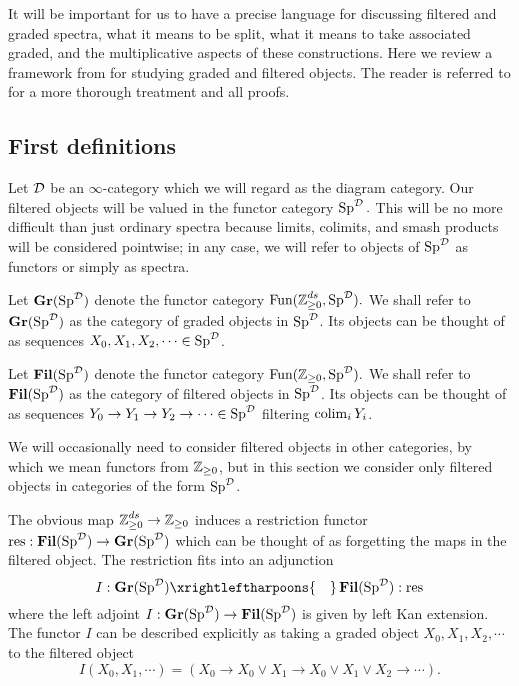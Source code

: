 
It will be important for us to have a precise language for discussing filtered and graded spectra, what it means to be split, what it means to take associated graded, and the multiplicative aspects of these constructions. Here we review a framework from \cite{LurieRot} for studying graded and filtered objects.  The reader is referred to \cite{LurieRot} for a more thorough treatment and all proofs.  

\subsection{First definitions}
Let $\D$ be an $\infty$-category which we will regard as the diagram category.  Our filtered objects will be valued in the functor category $\Sp^{\D}.$  This will be no more difficult than just ordinary spectra because limits, colimits, and smash products will be considered pointwise; in any case, we will refer to objects of $\Sp^{\D}$ as functors or simply as spectra.  

\begin{dfn} 
Let $\Gr(\Sp^{\D})$ denote the functor category $\Fun(\Z_{\geq 0}^{ds}, \Sp^{\D}).$  We shall refer to $\Gr(\Sp^{\D})$ as the category of graded objects in $\Sp^{\D}$.  Its objects can be thought of as sequences $X_0, X_1,X_2,\cdots \in \Sp^{\D}$.
\end{dfn}

\begin{dfn} 
Let $\Fil(\Sp^{\D})$ denote the functor category $\Fun(\Z_{\geq 0}, \Sp^{\D}).$  We shall refer to $\Fil(\Sp^{\D})$ as the category of filtered objects in $\Sp^{\D}$.  Its objects can be thought of as sequences $Y_0\to Y_1\to Y_2 \to \cdots \in \Sp^{\D}$ filtering $\colim_i Y_i$.  
\end{dfn}

\begin{rmk}
We will occasionally need to consider filtered objects in other categories, by which we mean functors from $\Z_{\geq 0}$, but in this section we consider only filtered objects in categories of the form $\Sp^{\D}$.  
\end{rmk}


The obvious map $\Z_{\geq 0}^{ds} \to \Z_{\geq 0}$ induces a restriction functor $\text{res}: \Fil(\Sp^{\D}) \to \Gr(\Sp^{\D})$ which can be thought of as forgetting the maps in the filtered object.  The restriction fits into an adjunction  
$$I:\Gr(\Sp^{\D}) \xrightleftharpoons{\quad} \Fil(\Sp^{\D}) : \text{res}$$
where the left adjoint $I: \Gr(\Sp^{\D}) \to \Fil(\Sp^{\D})$ is given by left Kan extension.  The functor $I$ can be described explicitly as taking a graded object $X_0,X_1,X_2,\cdots$ to the filtered object $$I(X_0, X_1, \cdots) = (X_0\to X_0 \vee X_1\to X_0 \vee X_1 \vee X_2\to \cdots).$$   

